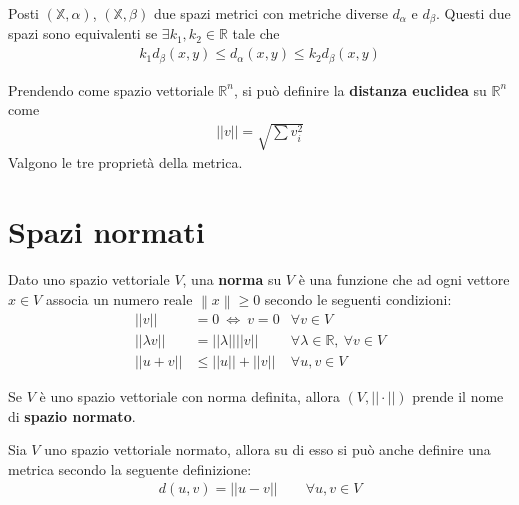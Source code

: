 \documentclass[a4paper, oneside]{book}
\begin{document}
\begin{lemma}
    Posti $(\mathbb{X}, \alpha)$, $(\mathbb{X}, \beta)$ due spazi metrici con metriche
    diverse $d_\alpha$ e $d_\beta$. Questi due spazi sono equivalenti se $\exists k_1, k_2 \in \mathbb{R}$ tale che
    \begin{gather*}
        k_1d_{\beta}(x, y) \leq d_{\alpha}(x, y) \leq k_2 d_{\beta}(x, y)
    \end{gather*}
\end{lemma}

\begin{example}
    Prendendo come spazio vettoriale $\mathbb{R}^{n}$,
    si può definire la \textbf{distanza euclidea} su $\mathbb{R}^{n}$ come
    \begin{gather*}
        ||v|| = \sqrt{\sum v_i^{2} } 
    \end{gather*} 
    Valgono le tre proprietà della metrica.
\end{example}


\clearpage
\section{Spazi normati}
Dato uno spazio vettoriale $V$, una \textbf{norma} su $V$ è una funzione che 
ad ogni vettore $x \in V$ associa un numero reale $\left\lVert x \right\rVert \geq 0$ secondo le seguenti 
condizioni:
\begin{align*}
    ||v|| &= 0 \ \Longleftrightarrow \ v = 0 &\forall v \in V\\
    ||\lambda v || &= ||\lambda|| ||v|| &\forall \lambda \in \mathbb{R}, \  \forall v \in V \\
    ||u + v|| &\leq ||u|| + ||v||  &\forall u, v \in V
\end{align*}

\begin{definition}
    Se $V$ è uno spazio vettoriale con norma definita, allora
    $(V, ||\cdot ||)$ prende il nome di \textbf{spazio normato}. 
\end{definition}



\begin{lemma}
    Sia $V$ uno spazio vettoriale normato, allora su di esso si può anche 
    definire una metrica secondo la seguente definizione:
    \begin{gather*}
        d(u, v) = ||u - v|| \qquad \forall u, v \in V
    \end{gather*}
\end{lemma}
\end{document}
